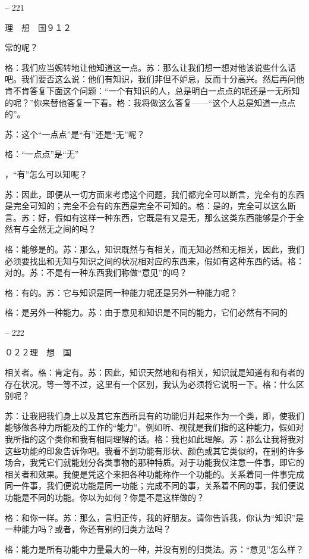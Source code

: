 \documentclass[11pt,oneside]{book}
\begin{document}
\begin{common-format}
    

-- 221

    理　想　国９１２

    常的呢？

    格：我们应当婉转地让他知道这一点。苏：那么让我们想一想对他该说些什么话吧。我们要否这么说：他们有知识，我们非但不妒忌，反而十分高兴。然后再问他肯不肯答复下面这个问题：“一个有知识的人，总是明白一点点的呢还是一无所知的呢？”你来替他答复一下看。格：我将做这么答复——“这个人总是知道一点点的”。

    苏：这个“一点点”是“有”还是“无”呢？

    格：“一点点”是“无”

    ，“有”怎么可以知呢？

    苏：因此，即便从一切方面来考虑这个问题，我们都完全可以断言，完全有的东西是完全可知的；完全不会有的东西是完全不可知的。格：是的，完全可以这么断言。苏：好，假如有这样一种东西，它既是有又是无，那么这类东西能够是介于全然有与全然无之间的吗？

    格：能够是的。苏：那么，知识既然与有相关，而无知必然和无相关，因此，我们必须要找出和无知与知识之间的状况相对应的东西来，假如有这种东西的话。格：对的。苏：不是有一种东西我们称做“意见”的吗？

    格：有的。苏：它与知识是同一种能力呢还是另外一种能力呢？

    格：是另外一种能力。苏：由于意见和知识是不同的能力，它们必然有不同的

    

-- 222

    ０２２理　想　国

    相关者。格：肯定有。苏：因此，知识天然地和有相关，知识就是知道有和有者的存在状况。等一等不过，这里有一个区别，我认为必须将它说明一下。格：什么区别呢？

    苏：让我把我们身上以及其它东西所具有的功能归并起来作为一个类，即，使我们能够做各种力所能及的工作的“能力”。例如听、视就是我们指的这种能力，假如对我所指的这个类你和我有相同理解的话。格：我也如此理解。苏：那么让我将我对这些功能的印象告诉你吧。我看不到功能有形状、颜色或其它类似的，在别的许多场合，我凭它们就能划分各类事物的那种特质。对于功能我仅注意一件事，即它的相关者和效果。我便是凭这个来把各种功能称作一个功能的。关系着同一件事完成同一件事，我们便说功能是同一功能；完成不同的事，关系着不同的事，我们便说功能是不同的功能。你以为如何？你是不是这样做的？

    格：和你一样。苏：那么，言归正传，我的好朋友。请你告诉我，你认为“知识”是一种能力吗？或者，你还有别的归类方法吗？

    格：能力是所有功能中力量最大的一种，并没有别的归类法。苏：“意见”怎么样？


\end{common-format}
\end{document}
